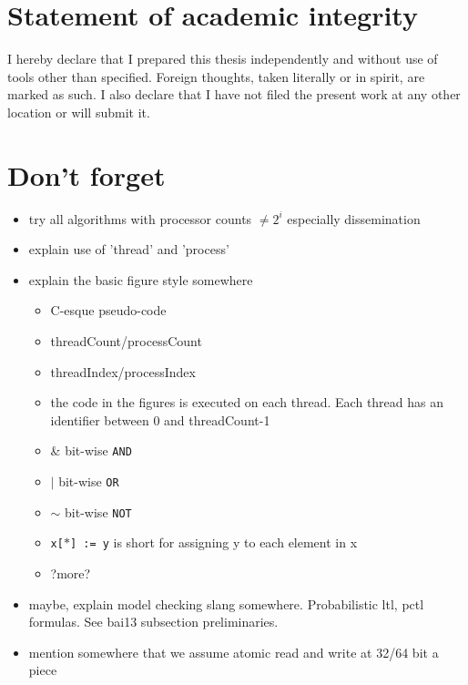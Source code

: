 \documentclass[a4paper, 10pt]{article}
\begin{document}
\section*{Statement of academic integrity}
I hereby declare that I prepared this thesis independently and without use of tools other than specified. Foreign thoughts, taken literally or in spirit, are marked as such. I also declare that I have not filed the present work at any other location or will submit it.

\pagebreak
\newpage \thispagestyle{empty} \mbox{}
\pagebreak

\renewcommand{\contentsname}{Table of contents}
\tableofcontents

\pagebreak
\newpage \thispagestyle{empty} \mbox{}
\pagebreak

\section{Don't forget}
\begin{itemize}
	\item try all algorithms with processor counts $\neq 2^i$ especially dissemination
	\item explain use of 'thread' and 'process'
	\item explain the basic figure style somewhere
		\begin{itemize}
			\item C-esque pseudo-code
			\item threadCount/processCount
			\item threadIndex/processIndex
			\item the code in the figures is executed on each thread. Each thread has an identifier between 0 and threadCount-1
			\item \& bit-wise \texttt{AND}
			\item $|$ bit-wise \texttt{OR}
			\item $\sim$ bit-wise \texttt{NOT}
			\item \texttt{x[$*$] := y} is short for assigning y to each element in x
			\item ?more?
		\end{itemize}
	\item maybe, explain model checking slang somewhere. Probabilistic ltl, pctl formulas. See bai13\cite{bai13} subsection preliminaries.
	\item mention somewhere that we assume atomic read and write at 32/64 bit a piece
\end{itemize}
\end{document}
